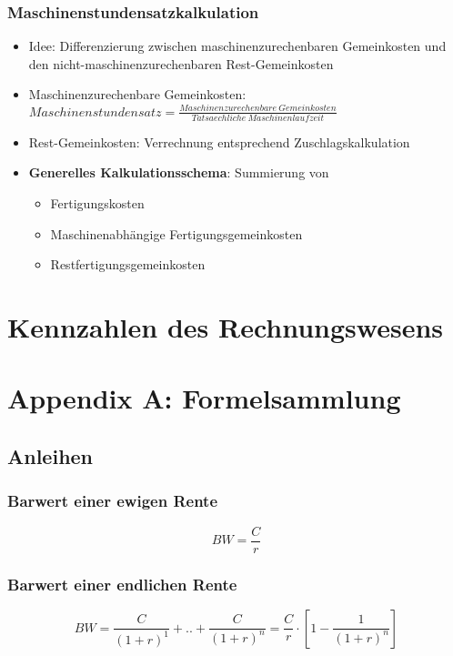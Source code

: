 \subsubsection{Maschinenstundensatzkalkulation}
\begin{itemize}
	\item Idee: Differenzierung zwischen maschinenzurechenbaren Gemeinkosten und den nicht-maschinenzurechenbaren Rest-Gemeinkosten
	\item Maschinenzurechenbare Gemeinkosten:\newline \(Maschinenstundensatz = \frac{Maschinenzurechenbare~Gemeinkosten}{Tatsaechliche~Maschinenlaufzeit}\)
	\item Rest-Gemeinkosten: Verrechnung entsprechend Zuschlagskalkulation
	\item \textbf{Generelles Kalkulationsschema}: Summierung von
	\begin{itemize}
		\item Fertigungskosten
		\item Maschinenabhängige Fertigungsgemeinkosten
		\item Restfertigungsgemeinkosten
	\end{itemize}
\end{itemize}



\section{Kennzahlen des Rechnungswesens}



\section{Appendix A: Formelsammlung}

\subsection{Anleihen}

\subsubsection{Barwert einer ewigen Rente}
\[BW = \frac{C}{r}\]

\subsubsection{Barwert einer endlichen Rente}
\[BW = \frac{C}{(1+r)^1}+..+\frac{C}{(1+r)^n} = \frac{C}{r}\cdot[1-\frac{1}{(1+r)^n}]\]

